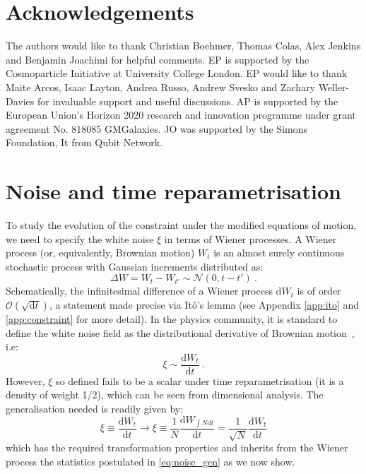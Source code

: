 \documentclass[amsmath,amssymb,11pt]{article}
\begin{document}
\vspace{3mm} 

\noindent\section*{Acknowledgements}

The authors would like to thank Christian Boehmer, Thomas Colas, Alex Jenkins and Benjamin Joachimi for helpful comments. EP is supported by the Cosmoparticle Initiative at University College London.
EP would like to thank Maite Arcos, Isaac Layton, Andrea Russo, Andrew Svesko and Zachary Weller-Davies for invaluable support and useful discussions. AP is supported by the European Union's Horizon 2020 research and innovation programme under grant agreement No. 818085 GMGalaxies. JO was supported by the Simons Foundation, It from Qubit Network.
\newpage

\appendix

\section{Noise and time reparametrisation}
\label{app:noise}
To study the evolution of the constraint under the modified equations of motion, we need to specify the white noise $\xi$ in terms of Wiener processes. A Wiener process (or, equivalently, Brownian motion) $W_t$ is an almost surely continuous stochastic process with Gaussian increments distributed as:
\begin{equation}
    \Delta W = W_t - W_{t'} \sim \mathcal{N}(0,t-t') \ .
\end{equation}
Schematically, the infinitesimal difference of a Wiener process $\text{d}W_t$ is of order $\mathcal{O}(\sqrt{\text{d}t})$, a statement made precise via It\^{o}'s lemma (see Appendix \ref{app:ito} and \ref{app:constraint} for more detail). In the physics community, it is standard to define the white noise field as the distributional derivative of Brownian motion~\cite{Oksendal:2023aa}, i.e:
\begin{equation}
    \xi \sim \frac{\text{d}W_t}{\text{d}t} \ .
\end{equation} 
However, $\xi$ so defined fails to be a scalar under time reparametrisation (it is a density of weight 1/2), which can be seen from dimensional analysis. The generalisation needed is readily  given by:
\begin{equation}
    \xi \equiv \frac{\text{d}W_t}{\text{d}t} \to \xi \equiv \frac{1}{N}\frac{\text{d}W_{\int N\text{d}t}}{\text{d}t} = \frac{1}{\sqrt{N}}\frac{\text{d}W_t}{\text{d}t}  \label{eq:noise}
\end{equation}
which has the required transformation properties and inherits from the Wiener process the statistics postulated in \eqref{eq:noise_gen} as we now show.
\end{document}
